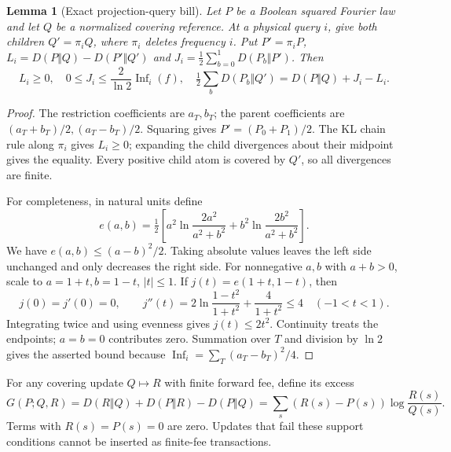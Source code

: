\documentclass[11pt]{article}
\newtheorem{lemma}{Lemma}
\begin{document}
\begin{lemma}[Exact projection-query bill]\label{lem:v12-query}
Let $P$ be a Boolean squared Fourier law and let $Q$ be a normalized covering reference.
At a physical query $i$, give both children $Q'=\pi_iQ$, where $\pi_i$ deletes frequency $i$.
Put $P'=\pi_iP$, $L_i=D(P\Vert Q)-D(P'\Vert Q')$ and
$J_i=\frac12\sum_{b=0}^1D(P_b\Vert P')$. Then
\[
 L_i\geq0,\quad 0\leq J_i\leq\frac2{\ln2}\operatorname{Inf}_i(f),\quad
 \tfrac12\sum_bD(P_b\Vert Q')=D(P\Vert Q)+J_i-L_i.
\]
\end{lemma}
\begin{proof}
The restriction coefficients are $a_T,b_T$; the parent coefficients are
$(a_T+b_T)/2,(a_T-b_T)/2$. Squaring gives
$P'=(P_0+P_1)/2$. The KL chain rule along $\pi_i$ gives $L_i\geq0$; expanding the
child divergences about their midpoint gives the equality. Every positive child atom
is covered by $Q'$, so all divergences are finite.

For completeness, in natural units define
\[
 e(a,b)=\tfrac12\left[a^2\ln\frac{2a^2}{a^2+b^2}
                       +b^2\ln\frac{2b^2}{a^2+b^2}\right].
\]
We have $e(a,b)\leq(a-b)^2/2$. Taking absolute values leaves the left side unchanged
and only decreases the right side. For nonnegative $a,b$ with $a+b>0$, scale to
$a=1+t,b=1-t$, $|t|\leq1$. If $j(t)=e(1+t,1-t)$, then
\[
 j(0)=j'(0)=0,\qquad
 j''(t)=2\ln\frac{1-t^2}{1+t^2}+\frac4{1+t^2}\leq4\quad(-1<t<1).
\]
Integrating twice and using evenness gives $j(t)\leq2t^2$. Continuity treats the
endpoints; $a=b=0$ contributes zero. Summation over $T$ and division by $\ln2$ gives
the asserted bound because $\operatorname{Inf}_i=\sum_T(a_T-b_T)^2/4$.
\end{proof}

For any covering update $Q\longmapsto R$ with finite forward fee, define its excess
\[
 G(P;Q,R)=D(R\Vert Q)+D(P\Vert R)-D(P\Vert Q)
          =\sum_s(R(s)-P(s))\log\frac{R(s)}{Q(s)}.
\]
Terms with $R(s)=P(s)=0$ are zero. Updates that fail these support conditions cannot
be inserted as finite-fee transactions.
\end{document}
